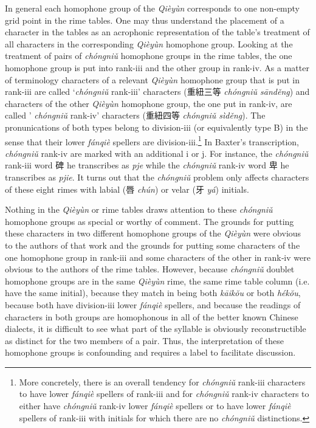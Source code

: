 In general each homophone group of the  \emph{Qièyùn} corresponds to one
non-empty grid point in the rime tables. One may thus understand the
placement of a character in the tables as an acrophonic representation
of the table's treatment of all characters in the corresponding
 \emph{Qièyùn} homophone group. Looking at the treatment of pairs of
 \emph{chóngniǔ} homophone groups in the rime tables, the one homophone
group is put into rank-iii and the other group in rank-iv. As a matter
of terminology characters of a relevant  \emph{Qièyùn} homophone group
that is put in rank-iii are called `\emph{chóngniǔ} rank-iii' characters
(重紐三等  \emph{chóngniǔ sānděng}) and characters of the other
 \emph{Qièyùn} homophone group, the one put in rank-iv, are called
' \emph{chóngniǔ} rank-iv' characters (重紐四等  \emph{chóngniǔ sìděng}).
The pronunications of both types belong to division-iii (or equivalently
type B) in the sense that their lower  \emph{fánqiè} spellers are
division-iii.\footnote{More concretely, there is an overall tendency for
   \emph{chóngniǔ} rank-iii characters to have lower  \emph{fánqiè}
  spellers of rank-iii and for \emph{chóngniǔ} rank-iv characters to
  either have \emph{chóngniǔ} rank-iv lower  \emph{fánqiè} spellers or to
  have lower \emph{fánqiè} spellers of rank-iii with initials for which
  there are no \emph{chóngniǔ} distinctions.} In Baxter's transcription,
 \emph{chóngniǔ} rank-iv are marked with an additional i or j. For
instance, the \emph{chóngniǔ} rank-iii word 碑 he transcribes as
 \emph{pje }while the \emph{chóngniǔ} rank-iv word 卑 he transcribes as
 \emph{pjie}. It turns out that the \emph{chóngniǔ} problem only affects
characters of these eight rimes with labial (唇  \emph{chún}) or velar
(牙  \emph{yá}) initials.

Nothing in the \emph{Qièyùn} or rime tables draws attention to these
 \emph{chóngniǔ }homophone groups as special or worthy of comment. The
grounds for putting these characters in two different homo­phone groups
of the  \emph{Qièyùn} were obvious to the authors of that work and the
grounds for putting some characters of the one homophone group in
rank-iii and some characters of the other in rank‑iv were obvious to the
authors of the rime tables. However, because  \emph{chóngniǔ} doublet
homophone groups are in the same  \emph{Qièyùn} rime, the same rime table
column (i.e. have the same initial), because they match in being both
 \emph{kāikŏu} or both \emph{hékŏu}, because both have division-iii lower
 \emph{fánqiè} spellers, and because the readings of characters in both
groups are homo­phonous in all of the better known Chinese dialects, it
is difficult to see what part of the syllable is obviously
reconstructible as distinct for the two members of a pair. Thus, the
interpretation of these homophone groups is confounding and requires a
label to facilitate discussion.

